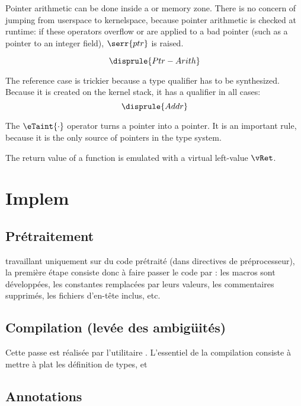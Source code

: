 Pointer arithmetic can be done inside a \qUser or \qKernel memory zone. There is
no concern of jumping from userspace to kernelspace, because pointer arithmetic
is checked at runtime: if these operators overflow or are applied to a bad
pointer (such as a pointer to an integer field), $\serr{ptr}$ is raised.

{\small \[ \disprule{Ptr-Arith} \]}%

The reference case is trickier because a type qualifier has to be synthesized.
Because it is created on the kernel stack, it has a \qKernel qualifier in all
cases:
{\small \[
  \disprule{Addr}
\]}%

The $\eTaint{\cdot}$ operator turns a \qUser pointer into a \qKernel pointer.
It is an important rule, because it is the only source of \qUser pointers in the
type system.

The return value of a function is emulated with a virtual left-value $\vRet$.%
{\small \begin{mathpar}

\end{mathpar}}%

\section{Implem}%

\subsection{Prétraitement}

\ctonewspeak{} travaillant uniquement sur du code prétraité (dans directives de
préprocesseur), la première étape consiste donc à faire passer le code par \cpp:
les macros sont développées, les constantes remplacées par leurs valeurs, les
commentaires supprimés, les fichiers d'en-tête inclus, etc.

\subsection{Compilation (levée des ambigüités)}

Cette passe est réalisée par l'utilitaire \ctonewspeak{}. L'essentiel de la
compilation consiste à mettre à plat les définition de types, et \subsection{Annotations}

